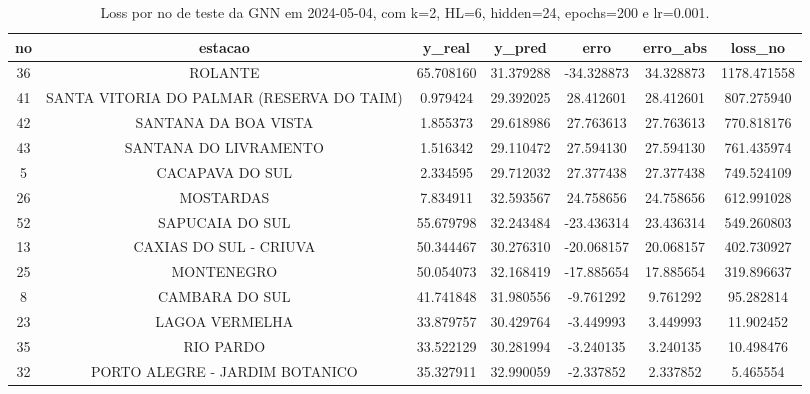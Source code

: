 \begin{table}[h]
\centering
\caption{Loss por no de teste da GNN em 2024-05-04, com k=2, HL=6, hidden=24, epochs=200 e lr=0.001.}
\label{tab:gnn_loss_k2_hl6_h24_e200_d20240504}
\begin{tabular}{ccccccc}
\toprule
no & estacao & y\_real & y\_pred & erro & erro\_abs & loss\_no \\
\midrule
36 & ROLANTE & 65.708160 & 31.379288 & -34.328873 & 34.328873 & 1178.471558 \\
41 & SANTA VITORIA DO PALMAR (RESERVA DO TAIM) & 0.979424 & 29.392025 & 28.412601 & 28.412601 & 807.275940 \\
42 & SANTANA DA BOA VISTA & 1.855373 & 29.618986 & 27.763613 & 27.763613 & 770.818176 \\
43 & SANTANA DO LIVRAMENTO & 1.516342 & 29.110472 & 27.594130 & 27.594130 & 761.435974 \\
5 & CACAPAVA DO SUL & 2.334595 & 29.712032 & 27.377438 & 27.377438 & 749.524109 \\
26 & MOSTARDAS & 7.834911 & 32.593567 & 24.758656 & 24.758656 & 612.991028 \\
52 & SAPUCAIA DO SUL & 55.679798 & 32.243484 & -23.436314 & 23.436314 & 549.260803 \\
13 & CAXIAS DO SUL - CRIUVA & 50.344467 & 30.276310 & -20.068157 & 20.068157 & 402.730927 \\
25 & MONTENEGRO & 50.054073 & 32.168419 & -17.885654 & 17.885654 & 319.896637 \\
8 & CAMBARA DO SUL & 41.741848 & 31.980556 & -9.761292 & 9.761292 & 95.282814 \\
23 & LAGOA VERMELHA & 33.879757 & 30.429764 & -3.449993 & 3.449993 & 11.902452 \\
35 & RIO PARDO & 33.522129 & 30.281994 & -3.240135 & 3.240135 & 10.498476 \\
32 & PORTO ALEGRE - JARDIM BOTANICO & 35.327911 & 32.990059 & -2.337852 & 2.337852 & 5.465554 \\
\bottomrule
\end{tabular}
\end{table}
